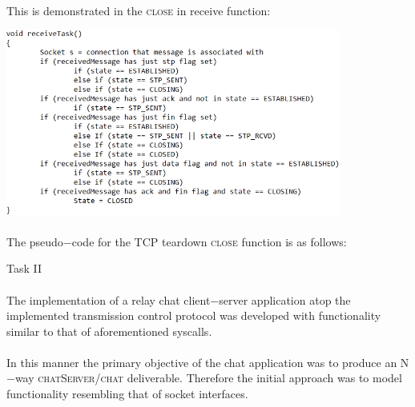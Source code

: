 \documentclass[12pt]{article}
\begin{document}
{    \paragraph{} This is demonstrated in the \textsc{close} in receive function:
\begin{center}
\includegraphics[width=110mm]{closeInReceive.png}
\end{center}
\paragraph{} The pseudo$-$code for the TCP teardown \textsc{close} function is as follows:
\begin{center}

\end{center} 
\begin{center}Task II\end{center}
\paragraph{} The implementation of a relay chat client$-$server application atop the implemented transmission control protocol was developed with functionality similar to that of aforementioned syscalls. 
\paragraph{} In this manner the primary objective of the chat application was to produce an N$-$way \textsc{chatServer}/\textsc{chat} deliverable. Therefore the initial approach was to model functionality resembling that of socket interfaces.
}
\end{document}
